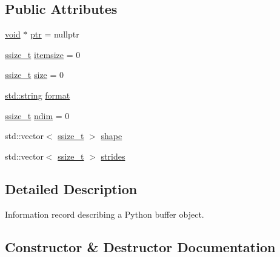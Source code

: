 \subsection*{Public Attributes}
\begin{DoxyCompactItemize}
\item 
\mbox{\hyperlink{_s_d_l__opengles2__gl2ext_8h_ae5d8fa23ad07c48bb609509eae494c95}{void}} $\ast$ \mbox{\hyperlink{structbuffer__info_a2976ad4b157156ebbcffe667888e2d28}{ptr}} = nullptr
\item 
\mbox{\hyperlink{detail_2common_8h_ac430d16fc097b3bf0a7469cfd09decda}{ssize\+\_\+t}} \mbox{\hyperlink{structbuffer__info_a8a95447f854c217a3b76168627900139}{itemsize}} = 0
\item 
\mbox{\hyperlink{detail_2common_8h_ac430d16fc097b3bf0a7469cfd09decda}{ssize\+\_\+t}} \mbox{\hyperlink{structbuffer__info_aa8d7471a42f3656b1b7a8b94d8fe03ae}{size}} = 0
\item 
\mbox{\hyperlink{_s_d_l__opengl__glext_8h_ab4ccfaa8ab0e1afaae94dc96ef52dde1}{std\+::string}} \mbox{\hyperlink{structbuffer__info_af5d89b84be8905b695a23b914e92bbda}{format}}
\item 
\mbox{\hyperlink{detail_2common_8h_ac430d16fc097b3bf0a7469cfd09decda}{ssize\+\_\+t}} \mbox{\hyperlink{structbuffer__info_a81d14cf3fc7ceae1b811f335bf35cd97}{ndim}} = 0
\item 
std\+::vector$<$ \mbox{\hyperlink{detail_2common_8h_ac430d16fc097b3bf0a7469cfd09decda}{ssize\+\_\+t}} $>$ \mbox{\hyperlink{structbuffer__info_a69da91575dde98ab488789dfd2d8daf4}{shape}}
\item 
std\+::vector$<$ \mbox{\hyperlink{detail_2common_8h_ac430d16fc097b3bf0a7469cfd09decda}{ssize\+\_\+t}} $>$ \mbox{\hyperlink{structbuffer__info_abd738097cc1960c4955040eec0619026}{strides}}
\end{DoxyCompactItemize}


\subsection{Detailed Description}
Information record describing a Python buffer object. 

\subsection{Constructor \& Destructor Documentation}
\mbox{\label{structbuffer__info_a7ba465a026eab59b502922baceb7e196}} 
